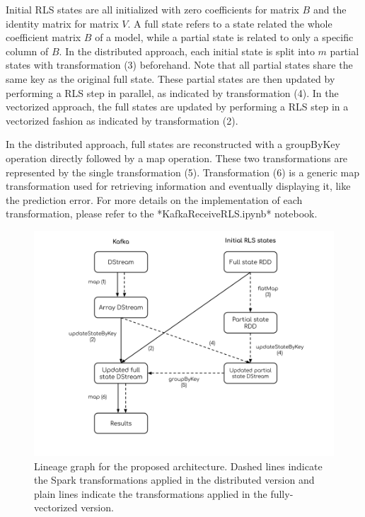 Initial RLS states are all initialized with zero coefficients for matrix $B$ and the identity matrix for matrix $V$.
A full state refers to a state related the whole coefficient matrix $B$ of a model,
while a partial state is related to only a specific column of $B$.
In the distributed approach, each initial state is split into $m$ partial states with transformation (3) beforehand.
Note that all partial states share the same key as the original full state.
These partial states are then updated by performing a RLS step in parallel, as indicated by transformation (4).
In the vectorized approach, the full states are updated by performing a RLS step in a vectorized fashion
as indicated by transformation (2).

In the distributed approach, full states are reconstructed with a groupByKey operation directly followed by a map operation.
These two transformations are represented by the single transformation (5).
Transformation (6) is a generic map transformation used for retrieving information and eventually displaying it,
like the prediction error. For more details on the implementation of each transformation, please refer to the
*KafkaReceiveRLS.ipynb* notebook.

\begin{figure}[H]
    \begin{center}
        \includegraphics[width=\textwidth, keepaspectratio]{imgs/lineage-graph.png}
        \caption{Lineage graph for the proposed architecture. Dashed lines indicate
            the Spark transformations applied in the distributed version
            and plain lines indicate the transformations applied in the fully-vectorized version.}
        \label{architecture}
    \end{center}
\end{figure}


